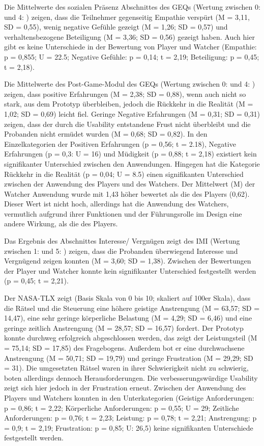 Die Mittelwerte des sozialen Präsenz Abschnittes des \ac{GEQ}s (Wertung zwischen 0:  und 4: ) zeigen, dass die Teilnehmer gegenseitig Empathie verspürt (M = 3,11, SD = 0,55), wenig negative Gefühle gezeigt (M = 1,26; SD = 0,57) und verhaltensbezogene Beteiligung (M = 3,36; SD = 0,56) gezeigt haben. Auch hier gibt es keine Unterschiede in der Bewertung von Player und Watcher (Empathie: p = 0,855; U = 22.5; Negative Gefühle: p = 0,14; t = 2,19; Beteiligung: p = 0,45; t = 2,18).

Die Mittelwerte des Post-Game-Modul des \ac{GEQ}s (Wertung zwischen 0:  und 4: ) zeigen, dass positive Erfahrungen (M = 2,38; SD = 0,88), wenn auch nicht so stark, aus dem Prototyp überbleiben, jedoch die Rückkehr in die Realität (M = 1,02; SD = 0,69) leicht fiel. Geringe Negative Erfahrungen (M = 0,31; SD = 0,31) zeigen, dass der durch die Usability entstandene Frust nicht überbleibt und die Probanden nicht ermüdet wurden (M = 0,68; SD = 0,82). In den Einzelkategorien der Positiven Erfahrungen (p = 0,56; t = 2.18), Negative Erfahrungen (p = 0,3: U = 16) und Müdigkeit (p = 0,88; t = 2,18) existiert kein signifikanter Unterschied zwischen den Anwendungen. Hingegen hat die Kategorie Rückkehr in die Realität (p = 0,04; U = 8.5) einen signifikanten Unterschied zwischen der Anwendung des Players und des Watchers. Der Mittelwert (M) der Watcher Anwendung wurde mit 1,43 höher bewertet als die des Players (0,62). Dieser Wert ist nicht hoch, allerdings hat die Anwendung des Watchers, vermutlich aufgrund ihrer Funktionen und der Führungsrolle im Design eine andere Wirkung, als die des Players.

Das Ergebnis des Abschnittes Interesse/ Vergnügen zeigt des \ac{IMI} (Wertung zwischen 1:  und 5: ) zeigen, dass die Probanden überwiegend Interesse und Vergnügend zeigen konnten (M = 3,60; SD = 1,38). Zwischen der Bewertungen der Player und Watcher konnte kein signifikanter Unterschied festgestellt werden (p = 0,45; t = 2,21). 

Der \ac{NASA-TLX} zeigt (Basis Skala von 0 bis 10; skaliert auf 100er Skala), dass die Rätsel und die Steuerung eine höhere geistige Anstrengung (M = 63,57; SD = 14,47), eine sehr geringe körperliche Belastung (M = 4,29; SD = 6,46) und eine geringe zeitlich Anstrengung (M = 28,57; SD = 16,57) fordert. 
Der Prototyp konnte durchweg erfolgreich abgeschlossen werden, das zeigt der Leistungsteil (M = 75,14; SD = 17,85) des Fragebogens. Außerdem bot er eine durchwachsene Anstrengung (M = 50,71; SD = 19,79) und geringe Frustration (M = 29,29; SD = 31). Die umgesetzten Rätsel waren in ihrer Schwierigkeit nicht zu schwierig, boten allerdings dennoch Herausforderungen. Die verbesserungswürdige Usability zeigt sich hier jedoch in der Frustration erneut. Zwischen der Anwendung des Players und Watchers konnten in den Unterkategorien (Geistige Anforderungen: p = 0,86; t = 2,22; Körperliche Anforderungen: p = 0,55; U = 29; Zeitliche Anforderungen: p = 0,76; t = 2,23; Leistung: p = 0,78; t = 2,21; Anstrengung: p = 0,9; t = 2,19; Frustration: p = 0,85; U: 26,5) keine signifikanten Unterschiede festgestellt werden.


